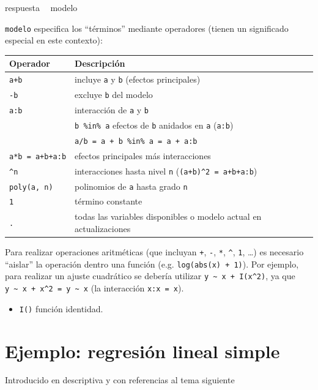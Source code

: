 \documentclass[]{book}
\newenvironment{Shaded}{\begin{snugshade}}{\end{snugshade}}
\newcommand{\StringTok}[1]{\textcolor[rgb]{0.31,0.60,0.02}{#1}}
\newcommand{\OperatorTok}[1]{\textcolor[rgb]{0.81,0.36,0.00}{\textbf{#1}}}
\newcommand{\NormalTok}[1]{#1}
\providecommand{\tightlist}{%
  \setlength{\itemsep}{0pt}\setlength{\parskip}{0pt}}
\begin{document}
\begin{Shaded}
\begin{Highlighting}[]
\NormalTok{respuesta }\OperatorTok{~}\StringTok{ }\NormalTok{modelo}
\end{Highlighting}
\end{Shaded}

\texttt{modelo} especifica los ``términos'' mediante operadores (tienen
un significado especial en este contexto):

\begin{longtable}[]{@{}ll@{}}
\toprule
Operador & Descripción\tabularnewline
\midrule
\endhead
\texttt{a+b} & incluye \texttt{a} y \texttt{b} (efectos
principales)\tabularnewline
\texttt{-b} & excluye \texttt{b} del modelo\tabularnewline
\texttt{a:b} & interacción de \texttt{a} y \texttt{b}\tabularnewline
\ & \texttt{b\ \%in\%\ a} efectos de \texttt{b} anidados en \texttt{a}
(\texttt{a:b})\tabularnewline
\ & \texttt{a/b\ =\ a\ +\ b\ \%in\%\ a\ =\ a\ +\ a:b}\tabularnewline
\texttt{a*b\ =\ a+b+a:b} & efectos principales más
interacciones\tabularnewline
\texttt{\^{}n} & interacciones hasta nivel \texttt{n}
(\texttt{(a+b)\^{}2\ =\ a+b+a:b})\tabularnewline
\texttt{poly(a,\ n)} & polinomios de \texttt{a} hasta grado
\texttt{n}\tabularnewline
\texttt{1} & término constante\tabularnewline
\texttt{.} & todas las variables disponibles o modelo actual en
actualizaciones\tabularnewline
\bottomrule
\end{longtable}

Para realizar operaciones aritméticas (que incluyan \texttt{+},
\texttt{-}, \texttt{*}, \texttt{\^{}}, \texttt{1}, \ldots{}) es
necesario ``aislar'' la operación dentro una función (e.g.
\texttt{log(abs(x)\ +\ 1)}). Por ejemplo, para realizar un ajuste
cuadrático se debería utilizar
\texttt{y\ \textasciitilde{}\ x\ +\ I(x\^{}2)}, ya que
\texttt{y\ \textasciitilde{}\ x\ +\ x\^{}2\ =\ y\ \textasciitilde{}\ x}
(la interacción \texttt{x:x\ =\ x}).

\begin{itemize}
\tightlist
\item
  \texttt{I()} función identidad.
\end{itemize}

\section{Ejemplo: regresión lineal
simple}\label{ejemplo-regresion-lineal-simple}

Introducido en descriptiva y con referencias al tema siguiente
\end{document}
